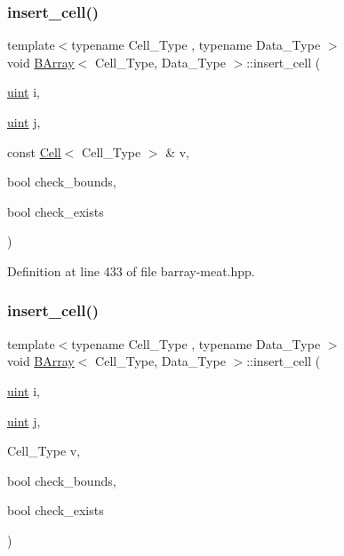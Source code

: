 \subsubsection{\texorpdfstring{insert\+\_\+cell()}{insert\_cell()}\hspace{0.1cm}{\footnotesize\ttfamily [1/2]}}
{\footnotesize\ttfamily template$<$typename Cell\+\_\+\+Type , typename Data\+\_\+\+Type $>$ \\
void \hyperlink{class_b_array}{B\+Array}$<$ Cell\+\_\+\+Type, Data\+\_\+\+Type $>$\+::insert\+\_\+cell (\begin{DoxyParamCaption}\item[{\hyperlink{typedefs_8hpp_a91ad9478d81a7aaf2593e8d9c3d06a14}{uint}}]{i,  }\item[{\hyperlink{typedefs_8hpp_a91ad9478d81a7aaf2593e8d9c3d06a14}{uint}}]{j,  }\item[{const \hyperlink{class_cell}{Cell}$<$ Cell\+\_\+\+Type $>$ \&}]{v,  }\item[{bool}]{check\+\_\+bounds,  }\item[{bool}]{check\+\_\+exists }\end{DoxyParamCaption})\hspace{0.3cm}{\ttfamily [inline]}}



Definition at line 433 of file barray-\/meat.\+hpp.

\mbox{\label{class_b_array_a4790d707fcf6a5b552816258922ca25b}} 
\subsubsection{\texorpdfstring{insert\+\_\+cell()}{insert\_cell()}\hspace{0.1cm}{\footnotesize\ttfamily [2/2]}}
{\footnotesize\ttfamily template$<$typename Cell\+\_\+\+Type , typename Data\+\_\+\+Type $>$ \\
void \hyperlink{class_b_array}{B\+Array}$<$ Cell\+\_\+\+Type, Data\+\_\+\+Type $>$\+::insert\+\_\+cell (\begin{DoxyParamCaption}\item[{\hyperlink{typedefs_8hpp_a91ad9478d81a7aaf2593e8d9c3d06a14}{uint}}]{i,  }\item[{\hyperlink{typedefs_8hpp_a91ad9478d81a7aaf2593e8d9c3d06a14}{uint}}]{j,  }\item[{Cell\+\_\+\+Type}]{v,  }\item[{bool}]{check\+\_\+bounds,  }\item[{bool}]{check\+\_\+exists }\end{DoxyParamCaption})\hspace{0.3cm}{\ttfamily [inline]}}



